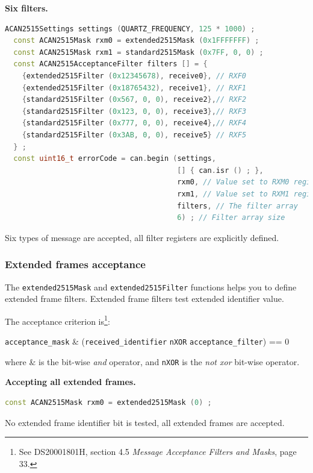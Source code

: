\documentclass[10pt, a4paper, obeyspaces]{extarticle}
\begin{document}
{\bf Six filters.}
{ \small\begin{lstlisting}[language=c++]
  ACAN2515Settings settings (QUARTZ_FREQUENCY, 125 * 1000) ;
  const ACAN2515Mask rxm0 = extended2515Mask (0x1FFFFFFF) ;
  const ACAN2515Mask rxm1 = standard2515Mask (0x7FF, 0, 0) ;
  const ACAN2515AcceptanceFilter filters [] = {
    {extended2515Filter (0x12345678), receive0}, // RXF0
    {extended2515Filter (0x18765432), receive1}, // RXF1
    {standard2515Filter (0x567, 0, 0), receive2},// RXF2
    {standard2515Filter (0x123, 0, 0), receive3},// RXF3
    {standard2515Filter (0x777, 0, 0), receive4},// RXF4
    {standard2515Filter (0x3AB, 0, 0), receive5} // RXF5
  } ;
  const uint16_t errorCode = can.begin (settings,
                                        [] { can.isr () ; },
                                        rxm0, // Value set to RXM0 register
                                        rxm1, // Value set to RXM1 register
                                        filters, // The filter array
                                        6) ; // Filter array size
\end{lstlisting}}

Six types of message are accepted, all filter registers are explicitly defined.










\subsubsection{Extended frames acceptance}

The \texttt{extended2515Mask} and \texttt{extended2515Filter} functions helps you to define extended frame filters. Extended frame filters test extended identifier value.

The acceptance criterion is\footnote{See DS20001801H, section 4.5 \emph{Message Acceptance Filters and Masks}, page 33.}:

\begin{center}
\texttt{acceptance\_mask} \& (\texttt{received\_identifier} \texttt{nXOR} \texttt{acceptance\_filter}) == 0
\end{center}
where \& is the bit-wise \emph{and} operator, and \texttt{nXOR} is the \emph{not xor} bit-wise operator.

{\bf Accepting all extended frames.}
{ \small\begin{lstlisting}[language=c++]
  const ACAN2515Mask rxm0 = extended2515Mask (0) ;
\end{lstlisting}}
No extended frame identifier bit is tested, all extended frames are accepted.
\end{document}
